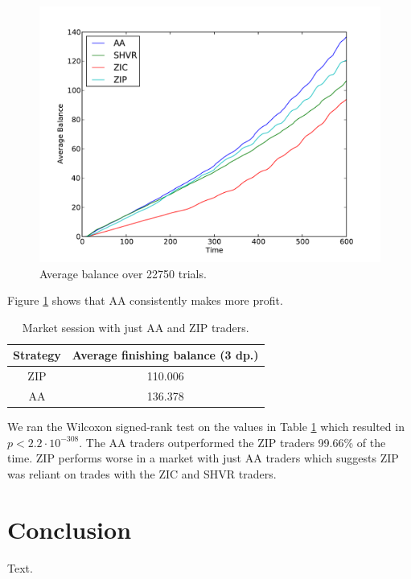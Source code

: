 \documentclass[preprint]{acm_proc_article-sp} %
\begin{document}
\begin{figure}[H]
  \centering
  \includegraphics[width=\columnwidth]{graphs_and_stats/graph_average_balance_vs_time.pdf}
  \caption{Average balance over 22750 trials.}
  \label{fig:average_balance_vs_time}
\end{figure}

Figure \ref{fig:average_balance_vs_time} shows that AA consistently makes more profit.

\begin{table}[H]
  \centering
  \begin{tabular}{ | c | c | }
    \hline
    Strategy & Average finishing balance (3 dp.) \\
    \hline
    ZIP & 110.006 \\
    AA & 136.378 \\
    \hline
  \end{tabular}
  \caption{Market session with just AA and ZIP traders.}
  \label{tbl:two_traders}
\end{table}

We ran the Wilcoxon signed-rank test on the values in Table
\ref{tbl:two_traders} which resulted in $p < 2.2 \cdot 10^{-308}$. The AA
traders outperformed the ZIP traders 99.66\% of the time. ZIP performs worse in
a market with just AA traders which suggests ZIP was reliant on trades with the
ZIC and SHVR traders.\\




\section{Conclusion} \label{sec:conclusion}
Text.\\



\end{document}
